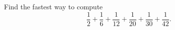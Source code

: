 Find the fastest way to compute
\[
\dfrac{1}{2}+\dfrac{1}{6}+\dfrac{1}{12}+\dfrac{1}{20}+\dfrac{1}{30}+\dfrac{1}{42}.
\]
